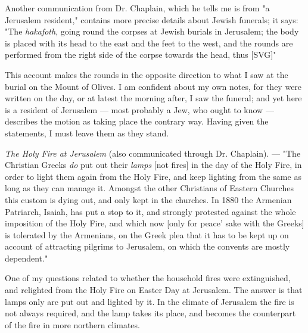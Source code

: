 \documentclass[a4paper, 11pt, oneside, polutonikogreek, english]{article}
\begin{document}
Another communication from Dr. Chaplain, which he tells me is from "a Jerusalem resident," contains more precise details about Jewish funerals; it says: "The \emph{hakafoth}, going round the corpses at Jewish burials in Jerusalem; the body is placed with its head to the east and the feet to the west, and the rounds are performed from the right side of the corpse towards the head, thus [SVG]"

This account makes the rounds in the opposite direction to what I saw at the burial on the Mount of Olives. I am confident about my own notes, for they were written on the day, or at latest the morning after, I saw the funeral; and yet here is a resident of Jerusalem --- most probably a Jew, who ought to know --- describes the motion as taking place the contrary way. Having given the statements, I must leave them as they stand.

\emph{The Holy Fire at Jerusalem} (also communicated through Dr. Chaplain). --- "The Christian Greeks \emph{do} put out their \emph{lamps} [not fires] in the day of the Holy Fire, in order to light them again from the Holy Fire, and keep lighting from the same as long as they can manage it. Amongst the other Christians of Eastern Churches this custom is dying out, and only kept in the churches. In 1880 the Armenian Patriarch, Isaiah, has put a stop to it, and strongly protested against the whole imposition of the Holy Fire, and which now [only for peace' sake with the Greeks] is tolerated by the Armenians, on the Greek plea that it has to be kept up on account of attracting pilgrims to Jerusalem, on which the convents are mostly dependent."

One of my questions related to whether the household fires were extinguished, and relighted from the Holy Fire on Easter Day at Jerusalem. The answer is that lamps only are put out and lighted by it. In the climate of Jerusalem the fire is not always required, and the lamp takes its place, and becomes the counterpart of the fire in more northern climates.
\end{document}

